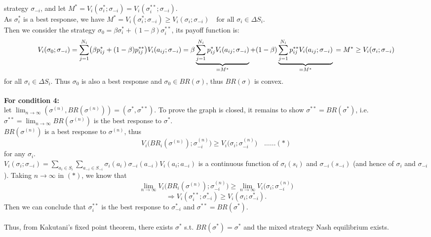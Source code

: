 \documentclass[twoside]{article}
\theoremstyle{definitionstyle}
\begin{document}
strategy \(\sigma_{-i}\), and let $M^* = V_i(\sigma_i^*; \sigma_{-i}) = V_i(\sigma_i^{**}; \sigma_{-i})$.\\
As \(\sigma_i^*\) is a best response, we have $M^* = V_i(\sigma_i^*; \sigma_{-i}) \ge V_i(\sigma_i; \sigma_{-i}) \quad \text{for all } \sigma_i \in \Delta S_i$.\\
Then we consider the strategy \(\sigma_0 = \beta\sigma_i^* + (1 - \beta)\sigma_i^{**}\), its payoff function is: 
\[
V_i(\sigma_0; \sigma_{-i}) 
= \sum_{j=1}^{N_i} \bigl(\beta p_{ij}^* + (1 - \beta)p_{ij}^{**}\bigr) V_i(a_{ij}; \sigma_{-i}) \\
= \beta \underbrace{\sum_{j=1}^{N_i} p_{ij}^* V_i(a_{ij}; \sigma_{-i})}_{= M^*} 
+ (1 - \beta) \underbrace{\sum_{j=1}^{N_i} p_{ij}^{**} V_i(a_{ij}; \sigma_{-i})}_{= M^*} \\
= M^* \ge V_i(\sigma_i; \sigma_{-i})
\]
for all \(\sigma_i \in \Delta S_i\). Thus \(\sigma_0\) is also a best response and \(\sigma_0 \in BR(\sigma)\), thus \(BR(\sigma)\) is convex.\\
\\
\textbf{For condition 4: }\\
let \(\lim_{n\to\infty} (\sigma^{(n)}, BR(\sigma^{(n)})) = (\sigma^*, \sigma^{**})\). To prove the graph is closed, it remains to show \(\sigma^{**} = BR(\sigma^*)\), i.e. \(\sigma^{**} = \lim_{n\to\infty} BR(\sigma^{(n)})\) is the best response to \(\sigma^*\).\\
\(BR(\sigma^{(n)})\) is a best response to \(\sigma^{(n)}\), thus 
\[
V_i\bigl(BR_i(\sigma^{(n)}); \sigma_{-i}^{(n)}\bigr) \ge V_i\bigl(\sigma_i; \sigma_{-i}^{(n)}\bigr) \quad\ldots\ldots (*)
\]
for any \(\sigma_i\).\\
\(V_i(\sigma_i; \sigma_{-i}) = \displaystyle\sum_{a_i\in S_i} \sum_{a_{-i}\in S_{-i}} \sigma_i(a_i)\sigma_{-i}(a_{-i}) V_i(a_i; a_{-i})\) is a continuous function of \(\sigma_i(s_i)\) and \(\sigma_{-i}(s_{-i})\) (and hence of \(\sigma_i\) and \(\sigma_{-i}\)). Taking \(n\to\infty\) in \((*)\), we know that 
\[
\lim_{n\to\infty} V_i\bigl(BR_i(\sigma^{(n)}); \sigma_{-i}^{(n)}\bigr) \ge \lim_{n\to\infty} V_i\bigl(\sigma_i; \sigma_{-i}^{(n)}\bigr)
\]
\[
\Rightarrow V_i(\sigma_i^{**}; \sigma_{-i}^*) \ge V_i(\sigma_i; \sigma_{-i}^*).
\]
Then we can conclude that \(\sigma_i^{**}\) is the best response to \(\sigma_{-i}^*\) and \(\sigma^{**} = BR(\sigma^*)\).\\
\\
Thus, from Kakutani's fixed point theorem, there exists $\sigma^*$ s.t. $ BR(\sigma^*) = \sigma^* $ and the mixed strategy Nash equilibrium exists. 
%
%
%
%
%
\end{document}
